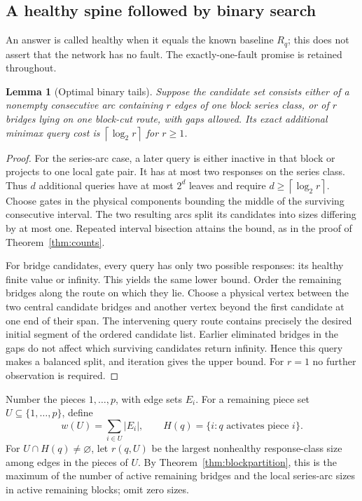 \documentclass[11pt,letterpaper]{article}
\newtheorem{lemma}[theorem]{Lemma}
\newcommand{\ceil}[1]{\left\lceil #1\right\rceil}
\begin{document}
\subsection{A healthy spine followed by binary search}
An answer is called healthy when it equals the known baseline $R_q$; this does not assert that the network has no fault. The exactly-one-fault promise is retained throughout.

\begin{lemma}[Optimal binary tails]\label{lem:binarytails}
Suppose the candidate set consists either of a nonempty consecutive arc containing $r$ edges of one block series class, or of $r$ bridges lying on one block-cut route, with gaps allowed. Its exact additional minimax query cost is $\ceil{\log_2 r}$ for $r\ge1$.
\end{lemma}
\begin{proof}
For the series-arc case, a later query is either inactive in that block or projects to one local gate pair. It has at most two responses on the series class. Thus $d$ additional queries have at most $2^d$ leaves and require $d\ge\ceil{\log_2 r}$. Choose gates in the physical components bounding the middle of the surviving consecutive interval. The two resulting arcs split its candidates into sizes differing by at most one. Repeated interval bisection attains the bound, as in the proof of Theorem~\ref{thm:counts}.

For bridge candidates, every query has only two possible responses: its healthy finite value or infinity. This yields the same lower bound. Order the remaining bridges along the route on which they lie. Choose a physical vertex between the two central candidate bridges and another vertex beyond the first candidate at one end of their span. The intervening query route contains precisely the desired initial segment of the ordered candidate list. Earlier eliminated bridges in the gaps do not affect which surviving candidates return infinity. Hence this query makes a balanced split, and iteration gives the upper bound. For $r=1$ no further observation is required.
\end{proof}

Number the pieces $1,\ldots,p$, with edge sets $E_i$. For a remaining piece set $U\subseteq\{1,\ldots,p\}$, define
\[
 w(U)=\sum_{i\in U}|E_i|,
 \qquad H(q)=\{i:q\text{ activates piece }i\}.
\]
For $U\cap H(q)\ne\varnothing$, let $r(q,U)$ be the largest nonhealthy response-class size among edges in the pieces of $U$. By Theorem~\ref{thm:blockpartition}, this is the maximum of the number of active remaining bridges and the local series-arc sizes in active remaining blocks; omit zero sizes.
\end{document}
